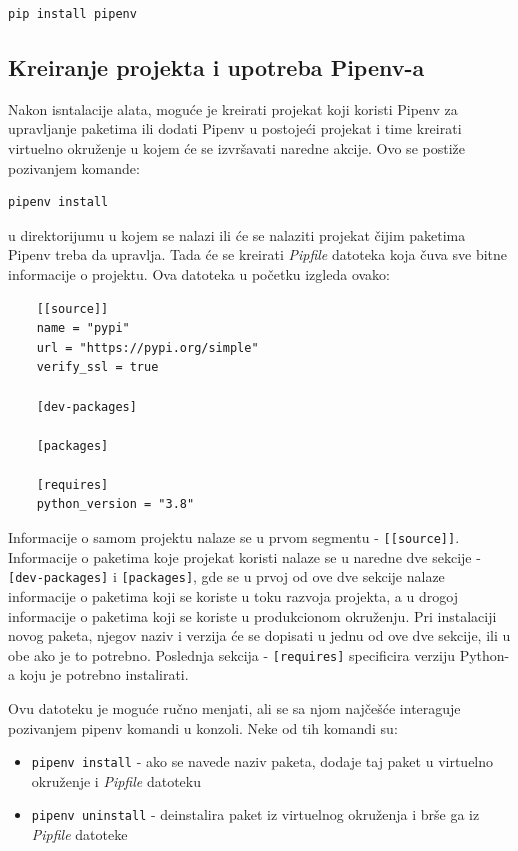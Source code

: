 \documentclass[12pt]{report}
\begin{document}
\begin{verbatim}
pip install pipenv
\end{verbatim}

\subsection{Kreiranje projekta i upotreba Pipenv-a}

Nakon isntalacije alata, moguće je kreirati projekat koji koristi Pipenv za upravljanje paketima ili dodati Pipenv u postojeći projekat i time kreirati virtuelno okruženje u kojem će se izvršavati naredne akcije. Ovo se postiže pozivanjem komande:

\begin{verbatim}
pipenv install
\end{verbatim}

u direktorijumu u kojem se nalazi ili će se nalaziti projekat čijim paketima Pipenv treba da upravlja. Tada će se kreirati \textit{Pipfile} datoteka koja čuva sve bitne informacije o projektu. Ova datoteka u početku izgleda ovako:

\begin{samepage}
    \begin{verbatim}
    [[source]]
    name = "pypi"
    url = "https://pypi.org/simple"
    verify_ssl = true

    [dev-packages]

    [packages]

    [requires]
    python_version = "3.8"
    \end{verbatim}
\end{samepage}

Informacije o samom projektu nalaze se u prvom segmentu - \texttt{[[source]]}. Informacije o paketima koje projekat koristi nalaze se u naredne dve sekcije - \texttt{[dev-packages]} i \texttt{[packages]}, gde se u prvoj od ove dve sekcije nalaze informacije o paketima koji se koriste u toku razvoja projekta, a u drogoj informacije o paketima koji se koriste u produkcionom okruženju. Pri instalaciji novog paketa, njegov naziv i verzija će se dopisati u jednu od ove dve sekcije, ili u obe ako je to potrebno. Poslednja sekcija - \texttt{[requires]} specificira verziju Python-a koju je potrebno instalirati.

Ovu datoteku je moguće ručno menjati, ali se sa njom najčešće interaguje pozivanjem pipenv komandi u konzoli. Neke od tih komandi su:

\begin{itemize}
    \item \texttt{pipenv install} - ako se navede naziv paketa, dodaje taj paket u virtuelno okruženje i \textit{Pipfile} datoteku
    \item \texttt{pipenv uninstall} - deinstalira paket iz virtuelnog okruženja i brše ga iz \textit{Pipfile} datoteke
\end{itemize}
\end{document}
